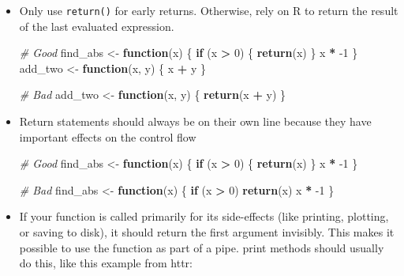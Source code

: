\documentclass[
]{book}
\newenvironment{Shaded}{\begin{snugshade}}{\end{snugshade}}
\newcommand{\CommentTok}[1]{\textcolor[rgb]{0.56,0.35,0.01}{\textit{#1}}}
\newcommand{\ControlFlowTok}[1]{\textcolor[rgb]{0.13,0.29,0.53}{\textbf{#1}}}
\newcommand{\DecValTok}[1]{\textcolor[rgb]{0.00,0.00,0.81}{#1}}
\newcommand{\KeywordTok}[1]{\textcolor[rgb]{0.13,0.29,0.53}{\textbf{#1}}}
\newcommand{\NormalTok}[1]{#1}
\newcommand{\OperatorTok}[1]{\textcolor[rgb]{0.81,0.36,0.00}{\textbf{#1}}}
\newcommand{\StringTok}[1]{\textcolor[rgb]{0.31,0.60,0.02}{#1}}
\begin{document}
\begin{itemize}
\item
  Only use \texttt{return()} for early returns. Otherwise, rely on R to return the
  result of the last evaluated expression.

\begin{Shaded}
\begin{Highlighting}[]
\CommentTok{# Good}
\NormalTok{find_abs <-}\StringTok{ }\ControlFlowTok{function}\NormalTok{(x) \{}
    \ControlFlowTok{if}\NormalTok{ (x }\OperatorTok{>}\StringTok{ }\DecValTok{0}\NormalTok{) \{}
        \KeywordTok{return}\NormalTok{(x)}
\NormalTok{    \}}
\NormalTok{    x }\OperatorTok{*}\StringTok{ }\DecValTok{-1}
\NormalTok{\}}
\NormalTok{add_two <-}\StringTok{ }\ControlFlowTok{function}\NormalTok{(x, y) \{}
\NormalTok{    x }\OperatorTok{+}\StringTok{ }\NormalTok{y}
\NormalTok{\}}

\CommentTok{# Bad}
\NormalTok{add_two <-}\StringTok{ }\ControlFlowTok{function}\NormalTok{(x, y) \{}
    \KeywordTok{return}\NormalTok{(x }\OperatorTok{+}\StringTok{ }\NormalTok{y)}
\NormalTok{\}}
\end{Highlighting}
\end{Shaded}
\item
  Return statements should always be on their own line because they have
  important effects on the control flow

\begin{Shaded}
\begin{Highlighting}[]
\CommentTok{# Good}
\NormalTok{find_abs <-}\StringTok{ }\ControlFlowTok{function}\NormalTok{(x) \{}
    \ControlFlowTok{if}\NormalTok{ (x }\OperatorTok{>}\StringTok{ }\DecValTok{0}\NormalTok{) \{}
        \KeywordTok{return}\NormalTok{(x)}
\NormalTok{    \}}
\NormalTok{    x }\OperatorTok{*}\StringTok{ }\DecValTok{-1}
\NormalTok{\}}

\CommentTok{# Bad}
\NormalTok{find_abs <-}\StringTok{ }\ControlFlowTok{function}\NormalTok{(x) \{}
    \ControlFlowTok{if}\NormalTok{ (x }\OperatorTok{>}\StringTok{ }\DecValTok{0}\NormalTok{) }\KeywordTok{return}\NormalTok{(x)}
\NormalTok{    x }\OperatorTok{*}\StringTok{ }\DecValTok{-1}
\NormalTok{\}}
\end{Highlighting}
\end{Shaded}
\item
  If your function is called primarily for its side-effects (like printing,
  plotting, or saving to disk), it should return the first argument invisibly.
  This makes it possible to use the function as part of a pipe. print methods
  should usually do this, like this example from httr:


\end{itemize}
\end{document}
